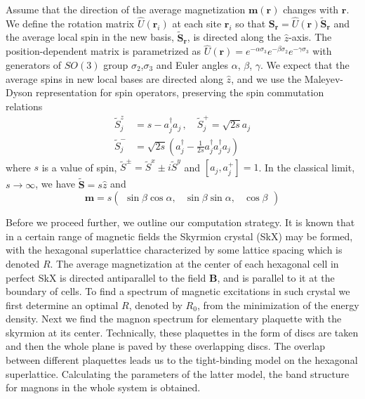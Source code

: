 \documentclass[aps,prb,twocolumn,superscriptaddress,nobalancelastpage]{revtex4-1}
\begin{document}
Assume that the direction of the average magnetization $\mathbf{m}(\mathbf{r})$ changes with $\mathbf{r}$. 
We define the rotation matrix $\hat U\left( \mathbf{r}_{i} \right )$ at each site ${\mathbf{r}_i}$  so that $\mathbf{S}_{\mathbf{r}}  = \hat U\left( \mathbf{r} \right )  \tilde {\mathbf{S}}_{\mathbf{r}}$ and the average local spin   in the new basis, $\tilde {\mathbf{S}}_{\mathbf{r}}$,  is directed along the $\hat z$-axis. 
The position-dependent matrix is parametrized as $\hat U(\mathbf{r}) = e^{-\alpha \sigma_3}e^{-\beta \sigma_2}e^{-\gamma \sigma_3}$ with generators of $SO(3)$ group $\sigma_2$,$\sigma_3$ and Euler angles $\alpha$, $\beta$, $\gamma$. 
We expect that the average spins in new local bases are directed along $\hat z$, and we use the Maleyev-Dyson representation for spin operators, preserving the spin commutation relations  
\begin{equation} 
\begin{aligned} 
     \tilde{S}^{z}_{j} &=s-a^\dagger_{ j} a_{ j} \,, \quad   
       \tilde{S}^{+}_{j}=\sqrt{2s}a_{ j}  \\
     \tilde{S}^{-}_{j} &=\sqrt{2s}\left( a^{\dagger}_{ j} - \frac{1}{2s}a^\dagger_{ j}a^{\dagger}_{ j}a_{ j} \right)
  \end{aligned}  
  \label{eq:boz}
 \end{equation} 
 where $s$ is a value of spin, $\tilde S^{\pm} = \tilde S^{x} \pm i \tilde S^{y}$ and $[a_{ j},a^+_{ j}] = 1$. In the classical limit, $s\to \infty$, we  have $\tilde {\mathbf{S}}  =  s \hat z $ and \begin{equation}
\mathbf{m} = s \begin{pmatrix}
\sin \beta \cos \alpha  ,&  
\sin \beta \sin \alpha  , & 
\cos \beta 
\end{pmatrix} 
\label{eq:parametr}
\end{equation}



Before we proceed further, we outline our computation strategy.  
It is known that in a certain range of magnetic fields the Skyrmion crystal (SkX) may be formed, with the hexagonal superlattice characterized by some lattice spacing which is denoted $R$.
The average magnetization at the center of each hexagonal cell in perfect SkX is directed antiparallel to the field $\mathbf{B}$, and is parallel to it at the boundary of cells. 
To find a spectrum of magnetic excitations in such crystal we first determine an optimal $R$, denoted by $R_{0}$, from the minimization of the energy density. Next we find the magnon spectrum for elementary plaquette with the skyrmion at its center. Technically, these plaquettes in the form of discs \cite{Bogdanov1994, Bogdanov1994a, Bogdanov1989} are taken and then the whole plane is paved by these overlapping discs. The overlap between different plaquettes leads us to the tight-binding model on the hexagonal superlattice. Calculating the parameters of the latter model, the band structure for magnons in the whole system is obtained.  
 
\end{document}
